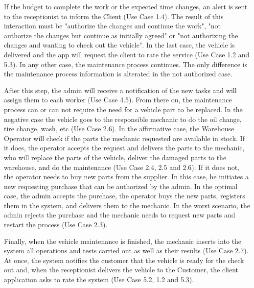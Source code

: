 If the budget to complete the work or the expected time changes, an alert is sent to the receptionist to inform the Client (Use Case 1.4). 
The result of this interaction must be "authorize the changes and continue the work", "not authorize the changes but continue as initially agreed" or "not authorizing the changes and wanting to check out the vehicle".
In the last case, the vehicle is delivered and the app will request the client to rate the service (Use Case 1.2 and 5.3). 
In any other case, the maintenance process continues. The only difference is the maintenance process information is alterated in the not authorized case.

After this step, the admin will receive a notification of the new tasks and will assign them to each worker (Use Case 4.5).
From there on, the maintenance process can or can not require the need for a vehicle part to be replaced. 
In the negative case the vehicle goes to the responsible mechanic to do the oil change, tire change, wash, etc (Use Case 2.6). 
In the affirmative case, the Warehouse Operator will check if the parts the mechanic requested are available in stock. 
If it does, the operator accepts the request and delivers the parts to the mechanic, who will replace the parts of the vehicle, deliver the damaged parts to the warehouse, and do the maintenance (Use Case 2.4, 2.5 and 2.6). 
If it does not, the operator needs to buy new parts from the supplier. 
In this case, he initiates a new requesting purchase that can be authorized by the admin. 
In the optimal case, the admin accepts the purchase, the operator buys the new parts, registers them in the system, and delivers them to the mechanic. 
In the worst scenario, the admin rejects the purchase and the mechanic needs to request new parts and restart the process (Use Case 2.3).    

Finally, when the vehicle maintenance is finished, the mechanic inserts into the system all operations and tests carried out as well as their results (Use Case 2.7). 
At once, the system notifies the customer that the vehicle is ready for the check out and, when the receptionist delivers the vehicle to the Customer, the client application asks to rate the system (Use Case 5.2, 1.2 and 5.3).

